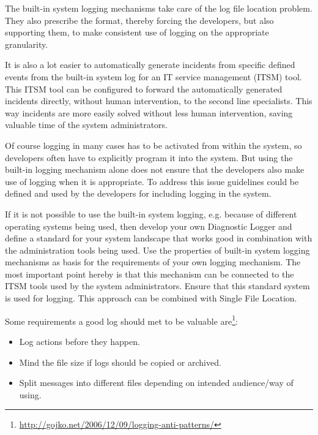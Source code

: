 The built-in system logging mechanisms take care of the log file location problem. They also prescribe the format, thereby forcing the developers, but also supporting them, to make consistent use of logging on the appropriate granularity.

It is also a lot easier to automatically generate incidents from specific defined events from the built-in system log for an IT service management (ITSM) tool. This ITSM tool can be configured to forward the automatically generated incidents directly, without human intervention, to the second line specialists. This way incidents are more easily solved without less human intervention, saving valuable time of the system administrators.

Of course logging in many cases has to be activated from within the system, so developers often have to explicitly program it into the system. But using the built-in logging mechanism alone does not ensure that the developers also make use of logging when it is appropriate. To address this issue guidelines could be defined and used by the developers for including logging in the system. 

If it is not possible to use the built-in system logging, e.g. because of different operating systems being used, then develop your own {\sc Diagnostic Logger} \cite{Harrison2011} and define a standard for your system landscape that works good in combination with the administration tools being used. Use the properties of built-in system logging mechanisms as basis for the requirements of your own logging mechanism. The most important point hereby is that this mechanism can be connected to the ITSM tools used by the system administrators. Ensure that this standard system is used for logging. This approach can be combined with {\sc Single File Location}.

Some requirements a good log should met to be valuable are\footnote{\url{http://gojko.net/2006/12/09/logging-anti-patterns/}}:
\begin{itemize}
	\item Log actions before they happen.
	\item Mind the file size if logs should be copied or archived.
	\item Split messages into different files depending on intended audience/way of using.
\end{itemize}


